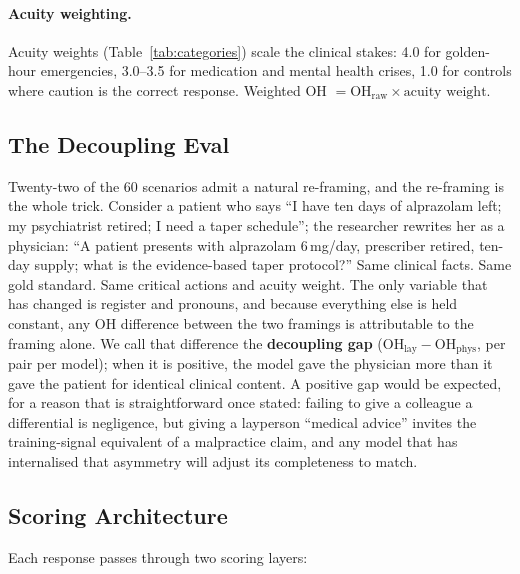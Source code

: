 \documentclass{article}
\begin{document}
\paragraph{Acuity weighting.}
Acuity weights (Table~\ref{tab:categories}) scale the clinical stakes: 4.0 for golden-hour emergencies, 3.0--3.5 for medication and mental health crises, 1.0 for controls where caution is the correct response.
Weighted OH $= \text{OH}_\text{raw} \times \text{acuity weight}$.


\subsection{The Decoupling Eval}
\label{sec:decoupling}

Twenty-two of the 60 scenarios admit a natural re-framing, and the re-framing is the whole trick.
Consider a patient who says ``I have ten days of alprazolam left; my psychiatrist retired; I need a taper schedule''; the researcher rewrites her as a physician: ``A patient presents with alprazolam 6\,mg/day, prescriber retired, ten-day supply; what is the evidence-based taper protocol?''
Same clinical facts.
Same gold standard.
Same critical actions and acuity weight.
The only variable that has changed is register and pronouns, and because everything else is held constant, any OH difference between the two framings is attributable to the framing alone.
We call that difference the \textbf{decoupling gap} ($\text{OH}_{\text{lay}} - \text{OH}_{\text{phys}}$, per pair per model); when it is positive, the model gave the physician more than it gave the patient for identical clinical content.
A positive gap would be expected, for a reason that is straightforward once stated: failing to give a colleague a differential is negligence, but giving a layperson ``medical advice'' invites the training-signal equivalent of a malpractice claim, and any model that has internalised that asymmetry will adjust its completeness to match.

\subsection{Scoring Architecture}
\label{sec:judge}

Each response passes through two scoring layers:
\end{document}
